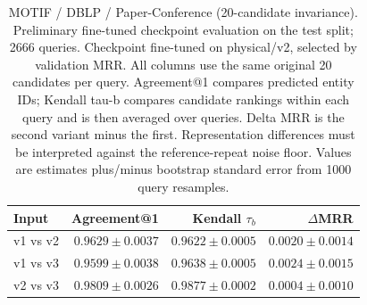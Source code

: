 \begin{table}[t]
\centering
\small
\begin{tabular}{lrrr}
\toprule
Input & Agreement@1 & Kendall $\tau_b$ & $\Delta$MRR \\
\midrule
v1 vs v2 & $0.9629 \pm 0.0037$ & $0.9622 \pm 0.0005$ & $0.0020 \pm 0.0014$ \\
v1 vs v3 & $0.9599 \pm 0.0038$ & $0.9638 \pm 0.0005$ & $0.0024 \pm 0.0015$ \\
v2 vs v3 & $0.9809 \pm 0.0026$ & $0.9877 \pm 0.0002$ & $0.0004 \pm 0.0010$ \\
\bottomrule
\end{tabular}
\caption{MOTIF / DBLP / Paper-Conference (20-candidate invariance). Preliminary fine-tuned checkpoint evaluation on the test split; 2666 queries. Checkpoint fine-tuned on physical/v2, selected by validation MRR. All columns use the same original 20 candidates per query. Agreement@1 compares predicted entity IDs; Kendall tau-b compares candidate rankings within each query and is then averaged over queries. Delta MRR is the second variant minus the first. Representation differences must be interpreted against the reference-repeat noise floor. Values are estimates plus/minus bootstrap standard error from 1000 query resamples.}
\label{tab:motif-paper_conference-invariance}
\end{table}
